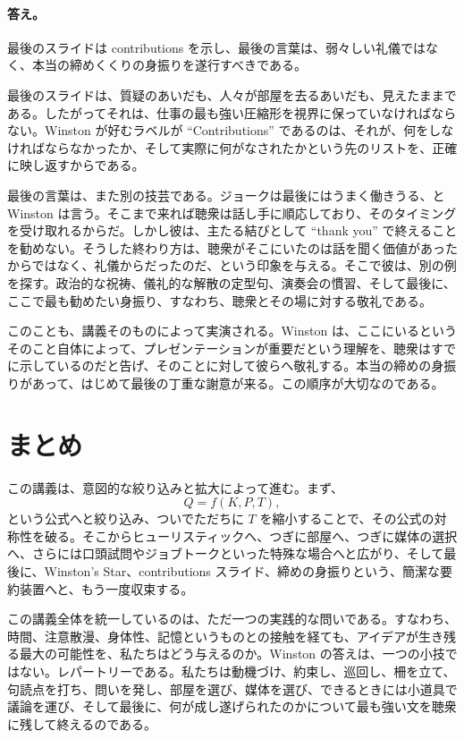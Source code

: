 \paragraph{答え。} 最後のスライドは contributions を示し、最後の言葉は、弱々しい礼儀ではなく、本当の締めくくりの身振りを遂行すべきである。

最後のスライドは、質疑のあいだも、人々が部屋を去るあいだも、見えたままである。したがってそれは、仕事の最も強い圧縮形を視界に保っていなければならない。Winston が好むラベルが ``Contributions'' であるのは、それが、何をしなければならなかったか、そして実際に何がなされたかという先のリストを、正確に映し返すからである。

最後の言葉は、また別の技芸である。ジョークは最後にはうまく働きうる、と Winston は言う。そこまで来れば聴衆は話し手に順応しており、そのタイミングを受け取れるからだ。しかし彼は、主たる結びとして ``thank you'' で終えることを勧めない。そうした終わり方は、聴衆がそこにいたのは話を聞く価値があったからではなく、礼儀からだったのだ、という印象を与える。そこで彼は、別の例を探す。政治的な祝祷、儀礼的な解散の定型句、演奏会の慣習、そして最後に、ここで最も勧めたい身振り、すなわち、聴衆とその場に対する敬礼である。

このことも、講義そのものによって実演される。Winston は、ここにいるというそのこと自体によって、プレゼンテーションが重要だという理解を、聴衆はすでに示しているのだと告げ、そのことに対して彼らへ敬礼する。本当の締めの身振りがあって、はじめて最後の丁重な謝意が来る。この順序が大切なのである。

\section{まとめ}

この講義は、意図的な絞り込みと拡大によって進む。まず、
\[
Q=f(K,P,T),
\]
という公式へと絞り込み、ついでただちに \(T\) を縮小することで、その公式の対称性を破る。そこからヒューリスティックへ、つぎに部屋へ、つぎに媒体の選択へ、さらには口頭試問やジョブトークといった特殊な場合へと広がり、そして最後に、Winston's Star、contributions スライド、締めの身振りという、簡潔な要約装置へと、もう一度収束する。

この講義全体を統一しているのは、ただ一つの実践的な問いである。すなわち、時間、注意散漫、身体性、記憶というものとの接触を経ても、アイデアが生き残る最大の可能性を、私たちはどう与えるのか。Winston の答えは、一つの小技ではない。レパートリーである。私たちは動機づけ、約束し、巡回し、柵を立て、句読点を打ち、問いを発し、部屋を選び、媒体を選び、できるときには小道具で議論を運び、そして最後に、何が成し遂げられたのかについて最も強い文を聴衆に残して終えるのである。